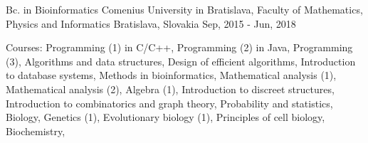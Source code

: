 \begin{cventries}
  \cventry
    {Bc. in Bioinformatics} %
    {Comenius University in Bratislava, Faculty of Mathematics, Physics and Informatics} %
    {Bratislava, Slovakia} %
    {Sep, 2015 - Jun, 2018} %
    {
      \begin{cvitems} %
        \item {Courses: 
        Programming (1) in C/C++, 
        Programming (2) in Java, 
        Programming (3), 
        Algorithms and data structures, 
        Design of efficient algorithms, 
        Introduction to database systems, 
        Methods in bioinformatics, 
        Mathematical analysis (1), 
        Mathematical analysis (2),
        Algebra (1), 
        Introduction to discreet structures, 
        Introduction to combinatorics and graph theory, 
        Probability and statistics, 
        Biology, 
        Genetics (1), 
        Evolutionary biology (1), 
        Principles of cell biology, 
        Biochemistry, 
        }
      \end{cvitems}
    }

\end{cventries}
